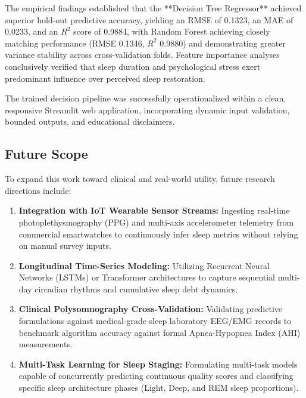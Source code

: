 \documentclass[12pt,a4paper]{article}
\begin{document}
The empirical findings established that the **Decision Tree Regressor** achieved superior hold-out predictive accuracy, yielding an RMSE of 0.1323, an MAE of 0.0233, and an $R^2$ score of 0.9884, with Random Forest achieving closely matching performance (RMSE 0.1346, $R^2$ 0.9880) and demonstrating greater variance stability across cross-validation folds. Feature importance analyses conclusively verified that sleep duration and psychological stress exert predominant influence over perceived sleep restoration. 

The trained decision pipeline was successfully operationalized within a clean, responsive Streamlit web application, incorporating dynamic input validation, bounded outputs, and educational disclaimers. 

\subsection{Future Scope}
To expand this work toward clinical and real-world utility, future research directions include:
\begin{enumerate}
    \item \textbf{Integration with IoT Wearable Sensor Streams:} Ingesting real-time photoplethysmography (PPG) and multi-axis accelerometer telemetry from commercial smartwatches to continuously infer sleep metrics without relying on manual survey inputs.
    \item \textbf{Longitudinal Time-Series Modeling:} Utilizing Recurrent Neural Networks (LSTMs) or Transformer architectures to capture sequential multi-day circadian rhythms and cumulative sleep debt dynamics.
    \item \textbf{Clinical Polysomnography Cross-Validation:} Validating predictive formulations against medical-grade sleep laboratory EEG/EMG records to benchmark algorithm accuracy against formal Apnea-Hypopnea Index (AHI) measurements.
    \item \textbf{Multi-Task Learning for Sleep Staging:} Formulating multi-task models capable of concurrently predicting continuous quality scores and classifying specific sleep architecture phases (Light, Deep, and REM sleep proportions).
\end{enumerate}
\end{document}
